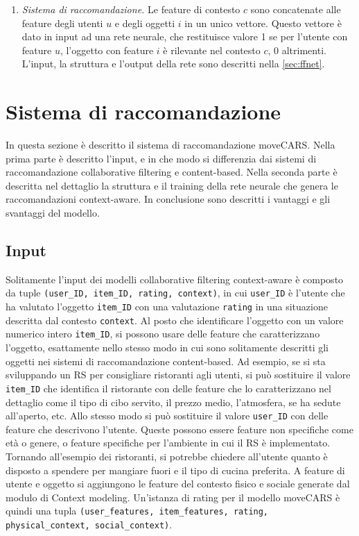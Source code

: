 \documentclass[12pt,italian]{report}
\begin{document}
\begin{enumerate}
 \item \textit{Sistema di raccomandazione.} Le feature di contesto $c$ sono concatenate alle feature degli utenti $u$ e degli oggetti $i$ in un unico vettore. Questo vettore è dato in input ad una rete neurale, che restituisce valore 1 se per l'utente con feature $u$, l'oggetto con feature $i$ è rilevante nel contesto $c$, 0 altrimenti. L'input, la struttura e l'output della rete sono descritti nella \autoref{sec:ffnet}.
\end{enumerate}

\section{Sistema di raccomandazione} \label{sec:ffnet}
In questa sezione è descritto il sistema di raccomandazione moveCARS. Nella prima parte è descritto l'input, e in che modo si differenzia dai sistemi di raccomandazione collaborative filtering e content-based. Nella seconda parte è descritta nel dettaglio la struttura e il training della rete neurale che genera le raccomandazioni context-aware. In conclusione sono descritti i vantaggi e gli svantaggi del modello.

\subsection{Input} \label{subsec:input}
Solitamente l'input dei modelli collaborative filtering context-aware è composto da tuple \texttt{(user\_ID, item\_ID, rating, context)}, in cui \texttt{user\_ID} è l'utente che ha valutato l'oggetto \texttt{item\_ID} con una valutazione \texttt{rating} in una situazione descritta dal contesto \texttt{context}. Al posto che identificare l'oggetto con un valore numerico intero \texttt{item\_ID}, si possono usare delle feature che caratterizzano l'oggetto, esattamente nello stesso modo in cui sono solitamente descritti gli oggetti nei sistemi di raccomandazione content-based. Ad esempio, se si sta sviluppando un RS per consigliare ristoranti agli utenti, si può sostituire il valore \texttt{item\_ID} che identifica il ristorante con delle feature che lo caratterizzano nel dettaglio come il tipo di cibo servito, il prezzo medio, l'atmosfera, se ha sedute all'aperto, etc. Allo stesso modo si può sostituire il valore \texttt{user\_ID} con delle feature che descrivono l'utente. Queste possono essere feature non specifiche come età o genere, o feature specifiche per l'ambiente in cui il RS è implementato. Tornando all'esempio dei ristoranti, si potrebbe chiedere all'utente quanto è disposto a spendere per mangiare fuori e il tipo di cucina preferita. A feature di utente e oggetto si aggiungono le feature del contesto fisico e sociale generate dal modulo di Context modeling. Un'istanza di rating per il modello moveCARS è quindi una tupla \texttt{(user\_features, item\_features, rating, physical\_context, social\_context)}.
\end{document}
